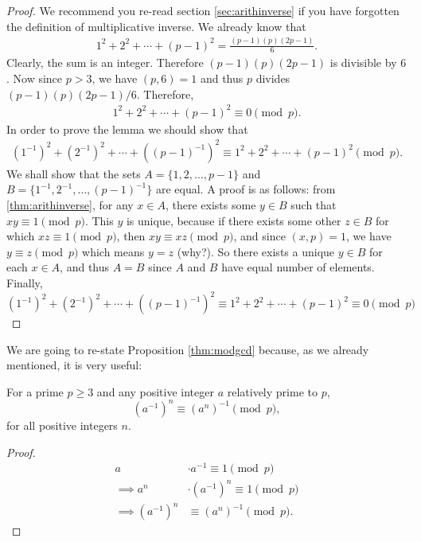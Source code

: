 \documentclass[12pt]{subfile}
\begin{document}
		\begin{proof}
			We recommend you re-read section \eqref{sec:arithinverse} if you have forgotten the definition of multiplicative inverse. We already know that
				\begin{align*}
					1^2+2^2+\cdots+(p-1)^2 = \frac{(p-1)(p)(2p-1)}{6}.
				\end{align*}
			Clearly, the sum is an integer. Therefore $(p-1)(p)(2p-1)$ is divisible by $6$. Now since $p>3$, we have $(p,6)=1$ and thus $p$ divides $(p-1)(p)(2p-1)/6$. Therefore,
				\begin{align*}
					1^2+2^2+\cdots+(p-1)^2 \equiv 0 \pmod p.
				\end{align*}
			In order to prove the lemma we should show that
				\begin{align*}
					(1^{-1})^2+(2^{-1})^2+\cdots+((p-1)^{-1})^2 \equiv 1^2+2^2+\cdots+(p-1)^2 \pmod p.
				\end{align*}
			We shall show that the sets $A=\{1,2,\ldots,p-1\}$ and $B=\{1^{-1}, 2^{-1},\ldots,(p-1)^{-1}\}$ are equal. A proof is as follows: from \autoref{thm:arithinverse}, for any $x \in A$, there exists some $y \in B$ such that $xy \equiv 1 \pmod p$. This $y$ is unique, because if there exists some other $z \in B$ for which $xz \equiv 1 \pmod p$, then $xy \equiv xz \pmod p$, and since $(x,p)=1$, we have $y \equiv z \pmod p$ which means $y=z$ (why?). So there exists a unique $y\in B$ for each $x \in A$, and thus $A=B$ since $A$ and $B$ have equal number of elements. Finally,
				\begin{equation*}
					(1^{-1})^2+(2^{-1})^2+\cdots+((p-1)^{-1})^2 \equiv 1^2+2^2+\cdots+(p-1)^2 \equiv 0 \pmod p
				\end{equation*}
		\end{proof}
	We are going to re-state Proposition \ref{thm:modgcd} because, as we already mentioned, it is very useful:
		\begin{lemma}\label{lem:wolstproof3}
			For a prime $p\geq 3$ and any positive integer $a$ relatively prime to $p$,
			\[ (a^{-1})^n \equiv (a^n)^{-1} \pmod p,\]
			for all positive integers $n$.
		\end{lemma}

		\begin{proof}
			\begin{align*}
				a
					& \cdot a^{-1} \equiv 1 \pmod p\\
				\implies a^n
					& \cdot (a^{-1})^n \equiv 1 \pmod p\\
				\implies(a^{-1})^n
					& \equiv (a^n)^{-1} \pmod p.
			\end{align*}

		\end{proof}
\end{document}
